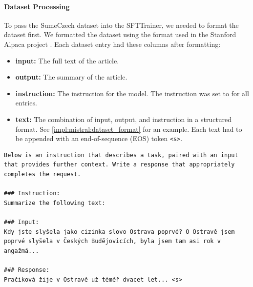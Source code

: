 \documentclass[english, ba, kiv, he, iso690numb, pdf, viewonly]{fasthesis}
\begin{document}
\paragraph{Dataset Processing}
To pass the SumeCzech dataset into the SFTTrainer, we needed to format the dataset first. We formatted the dataset using the format used in the Stanford Alpaca project \cite{alpaca}\cite{touvron2023llama}\cite{wang2023selfinstruct}. Each dataset entry had these columns after formatting:
\begin{itemize}
  \item \textbf{input:} The full text of the article.
  \item \textbf{output:} The summary of the article.
  \item \textbf{instruction:} The instruction for the model. The instruction was set to  for all entries.
  \item \textbf{text:} The combination of input, output, and instruction in a structured format. See \ref{impl:mistral:dataset_format} for an example. Each text had to be appended with an end-of-sequence (EOS) token \texttt{<s>}.
\end{itemize}
\lstset{style=FASThesisLstStyle,} %
\begin{lstlisting}[caption={Example of \texttt{text} column in formatted SumeCzech dataset entry. The input and response were truncated and appended with \texttt{...} due to their long length\label{impl:mistral:dataset_format}}] 
Below is an instruction that describes a task, paired with an input that provides further context. Write a response that appropriately completes the request.

### Instruction:
Summarize the following text:

### Input:
Kdy jste slyšela jako cizinka slovo Ostrava poprvé? O Ostravě jsem poprvé slyšela v Českých Budějovicích, byla jsem tam asi rok v angažmá...

### Response:
Pračiková žije v Ostravě už téměř dvacet let... <s>
\end{lstlisting}
\end{document}
